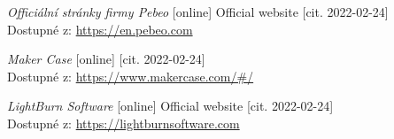 \begin{thebibliography}{99}
\textit{Officiální stránky firmy Pebeo} [online] Official website [cit. 2022-02-24] \\
Dostupné z: \url{https://en.pebeo.com} 

\textit{Maker Case} [online] [cit. 2022-02-24] \\
Dostupné z: \url{https://www.makercase.com/#/}

\textit{LightBurn Software} [online] Official website [cit. 2022-02-24] \\
Dostupné z: \url{https://lightburnsoftware.com} 




\end{thebibliography}
